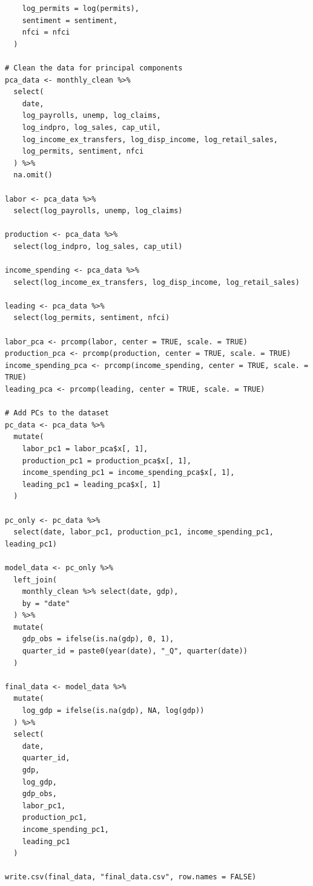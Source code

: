 \documentclass[11pt]{article}
\begin{document}
\begin{verbatim}
    log_permits = log(permits),
    sentiment = sentiment,
    nfci = nfci
  )

# Clean the data for principal components
pca_data <- monthly_clean %>%
  select(
    date,
    log_payrolls, unemp, log_claims,
    log_indpro, log_sales, cap_util,
    log_income_ex_transfers, log_disp_income, log_retail_sales,
    log_permits, sentiment, nfci
  ) %>%
  na.omit()

labor <- pca_data %>%
  select(log_payrolls, unemp, log_claims)

production <- pca_data %>%
  select(log_indpro, log_sales, cap_util)

income_spending <- pca_data %>%
  select(log_income_ex_transfers, log_disp_income, log_retail_sales)

leading <- pca_data %>%
  select(log_permits, sentiment, nfci)

labor_pca <- prcomp(labor, center = TRUE, scale. = TRUE)
production_pca <- prcomp(production, center = TRUE, scale. = TRUE)
income_spending_pca <- prcomp(income_spending, center = TRUE, scale. = TRUE)
leading_pca <- prcomp(leading, center = TRUE, scale. = TRUE)

# Add PCs to the dataset
pc_data <- pca_data %>%
  mutate(
    labor_pc1 = labor_pca$x[, 1],
    production_pc1 = production_pca$x[, 1],
    income_spending_pc1 = income_spending_pca$x[, 1],
    leading_pc1 = leading_pca$x[, 1]
  )

pc_only <- pc_data %>%
  select(date, labor_pc1, production_pc1, income_spending_pc1, leading_pc1)

model_data <- pc_only %>%
  left_join(
    monthly_clean %>% select(date, gdp),
    by = "date"
  ) %>%
  mutate(
    gdp_obs = ifelse(is.na(gdp), 0, 1),
    quarter_id = paste0(year(date), "_Q", quarter(date))
  )

final_data <- model_data %>%
  mutate(
    log_gdp = ifelse(is.na(gdp), NA, log(gdp))
  ) %>%
  select(
    date,
    quarter_id,
    gdp,
    log_gdp,
    gdp_obs,
    labor_pc1,
    production_pc1,
    income_spending_pc1,
    leading_pc1
  )

write.csv(final_data, "final_data.csv", row.names = FALSE)
\end{verbatim}
\end{document}
